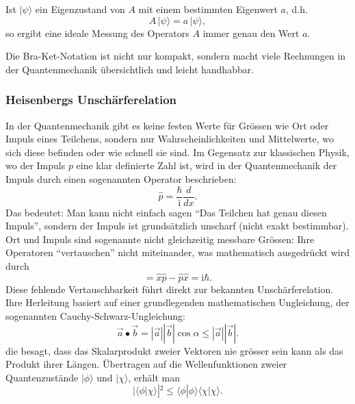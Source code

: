 Ist $|\psi\rangle$ ein Eigenzustand von $A$ mit einem bestimmten Eigenwert $a$, d.h.
\begin{equation}
  A\,|\psi\rangle = a\,|\psi\rangle,
\end{equation}
so ergibt eine ideale Messung des Operators $A$ immer genau den Wert $a$.

Die Bra-Ket-Notation ist nicht nur kompakt, sondern macht viele Rechnungen in der Quantenmechanik übersichtlich und leicht handhabbar.

\subsubsection{Heisenbergs Unschärferelation%
\label{fourier:subsubsection:unschaerferelation}}
In der Quantenmechanik gibt es keine festen Werte für Grössen wie Ort oder Impuls eines Teilchens, sondern nur Wahrscheinlichkeiten und Mittelwerte, wo sich diese befinden oder wie schnell sie sind.
Im Gegensatz zur klassischen Physik, wo der Impuls $p$ eine klar definierte Zahl ist, wird in der Quantenmechanik der Impuls durch einen sogenannten Operator beschrieben:
\begin{equation}
	\hat{p} = \frac{\hbar}{\mathrm{i}} \frac{d}{dx}.
\end{equation}
Das bedeutet:
Man kann nicht einfach sagen ``Das Teilchen hat genau diesen Impuls'', sondern der Impuls ist grundsätzlich unscharf (nicht exakt bestimmbar).
Ort und Impuls sind sogenannte nicht gleichzeitig messbare Grössen:
Ihre Operatoren ``vertauschen'' nicht miteinander, was mathematisch ausgedrückt wird durch
\begin{equation}
	[\hat{x},\hat{p}] = \hat{x} \hat{p} - \hat{p} \hat{x} = \mathrm{i} \hbar.
\end{equation}
Diese fehlende Vertauschbarkeit führt direkt zur bekannten Unschärferelation.
Ihre Herleitung basiert auf einer grundlegenden mathematischen Ungleichung, der sogenannten Cauchy-Schwarz-Ungleichung:
\begin{equation}
	\vec{a} \bullet \vec{b} = |\vec{a}| |\vec{b}|\cos\alpha \le |\vec{a}| |\vec{b}|.
\end{equation}
die besagt, dass das Skalarprodukt zweier Vektoren nie grösser sein kann als das Produkt ihrer Längen.
Übertragen auf die Wellenfunktionen zweier Quantenzustände $|\phi\rangle$ und $|\chi\rangle$, erhält man
\begin{equation}
	|\langle\phi | \chi\rangle|^2 \le \langle\phi | \phi\rangle \langle\chi | \chi\rangle.
\end{equation}
